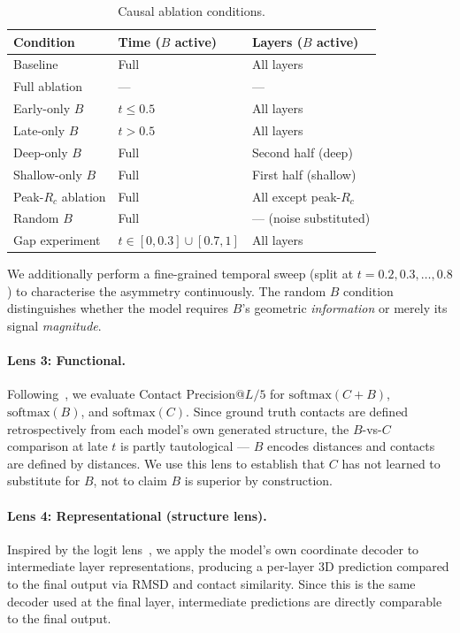\documentclass{article}
\begin{document}
\begin{table}[h]
    \centering
    \vspace{-4pt}
    \caption{Causal ablation conditions.}
    \label{tab:ablation_conditions}
    \begin{tabular}{lll}
        \toprule
        Condition & Time ($B$ active) & Layers ($B$ active) \\
        \midrule
        Baseline & Full & All layers \\
        Full ablation & --- & --- \\
        Early-only $B$ & $t \leq 0.5$ & All layers \\
        Late-only $B$ & $t > 0.5$ & All layers \\
        Deep-only $B$ & Full & Second half (deep) \\
        Shallow-only $B$ & Full & First half (shallow) \\
        Peak-$R_c$ ablation & Full & All except peak-$R_c$ \\
        Random $B$ & Full & --- (noise substituted) \\
        Gap experiment & $t \in [0, 0.3] \cup [0.7, 1]$ & All layers \\
        \bottomrule
    \end{tabular}
    \vspace{-2pt}
\end{table}

We additionally perform a fine-grained temporal sweep (split at $t = 0.2, 0.3, \ldots, 0.8$) to characterise the asymmetry continuously.
The random $B$ condition distinguishes whether the model requires $B$'s geometric \emph{information} or merely its signal \emph{magnitude}.

\paragraph{Lens 3: Functional.}
Following~\citet{rao2020transformer}, we evaluate Contact Precision@$L/5$ for $\mathrm{softmax}(C + B)$, $\mathrm{softmax}(B)$, and $\mathrm{softmax}(C)$.
Since ground truth contacts are defined retrospectively from each model's own generated structure, the $B$-vs-$C$ comparison at late $t$ is partly tautological --- $B$ encodes distances and contacts are defined by distances.
We use this lens to establish that $C$ has not learned to substitute for $B$, not to claim $B$ is superior by construction.

\paragraph{Lens 4: Representational (structure lens).}
Inspired by the logit lens~\citep{nostalgebraist2020logitlens}, we apply the model's own coordinate decoder to intermediate layer representations, producing a per-layer 3D prediction compared to the final output via RMSD and contact similarity.
Since this is the same decoder used at the final layer, intermediate predictions are directly comparable to the final output.
\end{document}
